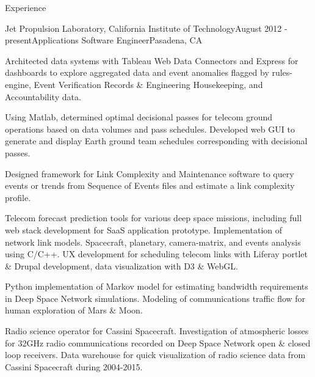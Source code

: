\documentclass{resume} %
\begin{document}





\begin{rSection}{Experience}
\begin{rSubsection}{Jet Propulsion Laboratory, California Institute of Technology}{August 2012 - present}{Applications Software Engineer}{Pasadena, CA}
\item Architected data systems with Tableau Web Data Connectors and Express for dashboards to explore aggregated data and event anomalies flagged by rules-engine, Event Verification Records \& Engineering Housekeeping, and Accountability data.
\item Using Matlab, determined optimal decisional passes for telecom ground operations based on data volumes and pass schedules. Developed web GUI to generate and display Earth ground team schedules corresponding with decisional passes.
\item Designed framework for Link Complexity and Maintenance software to query events or trends from Sequence of Events files and estimate a link complexity profile.
\item Telecom forecast prediction tools for various deep space missions, including full web stack development for SaaS application prototype. Implementation of network link models. Spacecraft, planetary, camera-matrix, and events analysis using C/C++. UX development for scheduling telecom links with Liferay portlet \& Drupal development, data visualization with D3 \& WebGL. 
\item Python implementation of Markov model for estimating bandwidth requirements in Deep Space Network simulations. Modeling of communications traffic flow for human exploration of Mars \& Moon. 
\item Radio science operator for Cassini Spacecraft. Investigation of atmospheric losses for 32GHz radio communications recorded on Deep Space Network open \& closed loop receivers. Data warehouse for quick visualization of radio science data from Cassini Spacecraft during 2004-2015. 
\end{rSubsection}


\end{rSection}
\end{document}
